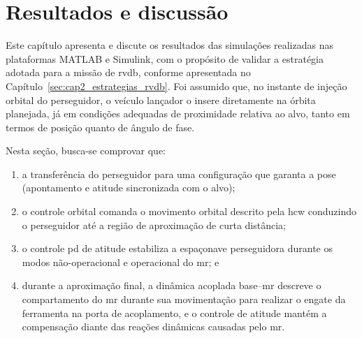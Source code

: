 \chapter{Resultados e discussão}
\label{sec:cap4_objetivo_criterios}

Este capítulo apresenta e discute os resultados das simulações realizadas nas plataformas MATLAB e Simulink, com o propósito de validar a estratégia adotada para a missão de \gls{rvdb}, conforme apresentada no Capítulo~\ref{sec:cap2_estrategias_rvdb}.
Foi assumido que, no instante de injeção orbital do perseguidor, o veículo lançador o insere diretamente na órbita planejada, já em condições adequadas de proximidade relativa ao alvo, tanto em termos de posição quanto de ângulo de fase.

Nesta seção, busca-se comprovar que:

\begin{enumerate}[label=(\roman*)]
  \item a transferência do perseguidor para uma configuração que garanta a pose (apontamento e atitude sincronizada com o alvo);
  \item o controle orbital comanda o movimento orbital descrito pela \gls{hcw} conduzindo o perseguidor até a região de aproximação de curta distância;
  \item o controle \gls{pd} de atitude estabiliza a espaçonave perseguidora durante os modos não-operacional e operacional do \gls{mr}; e
  \item durante a aproximação final, a dinâmica acoplada base--\gls{mr} descreve o compartamento do \gls{mr} durante sua movimentação para realizar o engate da ferramenta na porta de acoplamento, e o controle de atitude mantém a compensação diante das reações dinâmicas causadas pelo \gls{mr}.
\end{enumerate}


% 
% 
% 
% 













% 

